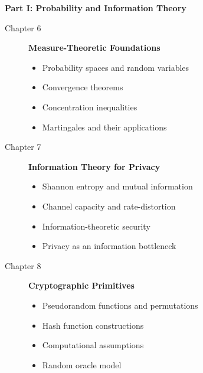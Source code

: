 \textbf{Part I: Probability and Information Theory}
\begin{description}
\item[Chapter 6] \textbf{Measure-Theoretic Foundations}
    \begin{itemize}
    \item Probability spaces and random variables
    \item Convergence theorems
    \item Concentration inequalities
    \item Martingales and their applications
    \end{itemize}

\item[Chapter 7] \textbf{Information Theory for Privacy}
    \begin{itemize}
    \item Shannon entropy and mutual information
    \item Channel capacity and rate-distortion
    \item Information-theoretic security
    \item Privacy as an information bottleneck
    \end{itemize}

\item[Chapter 8] \textbf{Cryptographic Primitives}
    \begin{itemize}
    \item Pseudorandom functions and permutations
    \item Hash function constructions
    \item Computational assumptions
    \item Random oracle model
    \end{itemize}
\end{description}

